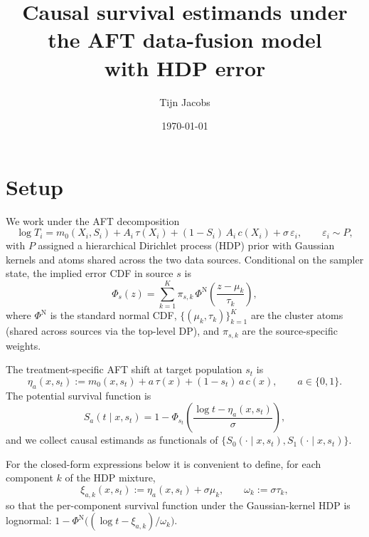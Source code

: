 \documentclass[11pt]{article}
\title{Causal survival estimands under the AFT data-fusion model\\
with HDP error}
\author{Tijn Jacobs}
\date{\today}
\theoremstyle{plain}
\theoremstyle{definition}
\theoremstyle{remark}
\newcommand{\1}{\mathds{1}}
\newcommand{\X}{X}
\newcommand{\A}{A}
\newcommand{\Sx}{S}
\newcommand{\tauf}{\tau}
\newcommand{\cf}{c}
\newcommand{\mzero}{m_{0}}
\newcommand{\Spot}{S}
\begin{document}
\maketitle

\section{Setup}

We work under the AFT decomposition
\begin{equation}
  \log T_{i} = \mzero(\X_{i}, \Sx_{i})
            + \A_{i}\,\tauf(\X_{i})
            + (1 - \Sx_{i})\,\A_{i}\,\cf(\X_{i})
            + \sigma\,\varepsilon_{i},
  \qquad \varepsilon_{i} \sim P,
  \label{eq:model}
\end{equation}
with $P$ assigned a hierarchical Dirichlet process (HDP) prior with Gaussian
kernels and atoms shared across the two data sources. Conditional on the
sampler state, the implied error CDF in source $s$ is
\begin{equation}
  \Phi_{s}(z) = \sum_{k=1}^{K} \pi_{s, k}\,
                \Phi^{\mathrm{N}}\!\left(\frac{z - \mu_{k}}{\tau_{k}}\right),
  \label{eq:hdp-cdf}
\end{equation}
where $\Phi^{\mathrm{N}}$ is the standard normal CDF,
$\{(\mu_{k}, \tau_{k})\}_{k=1}^{K}$ are the cluster atoms (shared across
sources via the top-level DP), and $\pi_{s,k}$ are the source-specific
weights.

The treatment-specific AFT shift at target population $s_{t}$ is
\begin{equation}
  \eta_{a}(x, s_{t}) := \mzero(x, s_{t})
                    + a\,\tauf(x)
                    + (1 - s_{t})\,a\,\cf(x),
  \qquad a \in \{0, 1\}.
\end{equation}
The potential survival function is
\begin{equation}
  \Spot_{a}(t \mid x, s_{t})
  = 1 - \Phi_{s_{t}}\!\left(\frac{\log t - \eta_{a}(x, s_{t})}{\sigma}\right),
  \label{eq:potential-S}
\end{equation}
and we collect causal estimands as functionals of
$\{\Spot_{0}(\cdot \mid x, s_{t}), \Spot_{1}(\cdot \mid x, s_{t})\}$.

For the closed-form expressions below it is convenient to define, for each
component $k$ of the HDP mixture,
\begin{equation}
  \xi_{a, k}(x, s_{t}) := \eta_{a}(x, s_{t}) + \sigma\mu_{k},
  \qquad
  \omega_{k} := \sigma\tau_{k},
\end{equation}
so that the per-component survival function under the Gaussian-kernel HDP
is lognormal:
$1 - \Phi^{\mathrm{N}}\bigl((\log t - \xi_{a, k})/\omega_{k}\bigr)$.
\end{document}
